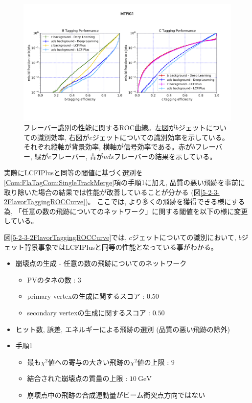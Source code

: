 \begin{figure}[htbp]
 \centering
 \includegraphics[trim = 0 150 0 200, width=1.0\textwidth, clip]{Figure/5Comparison/5-2-3-1FlavorTaggingROCCurve.png}
 \caption[フレーバータギングの性能に関するROC曲線]{フレーバー識別の性能に関するROC曲線。左図が$b$ジェットについての識別効率, 右図が$c$ジェットについての識別効率を示している。それぞれ縦軸が背景効率, 横軸が信号効率である。赤が$b$フレーバー, 緑が$c$フレーバー, 青が$uds$フレーバーの結果を示している。}
 \label{5-2-3-1FlavorTaggingROCCurve}
\end{figure}

実際にLCFIPlusと同等の閾値に基づく選別を\ref{Com:FlaTagCom:SingleTrackMerge}項の手順1に加え, 品質の悪い飛跡を事前に取り除いた場合の結果では性能が改善していることが分かる (図\ref{5-2-3-2FlavorTaggingROCCurve})。
ここでは, より多くの飛跡を獲得できる様にする為, 「任意の数の飛跡についてのネットワーク」に関する閾値を以下の様に変更している。

図\ref{5-2-3-2FlavorTaggingROCCurve}では, $c$ジェットについての識別において, $b$ジェット背景事象ではLCFIPlusと同等の性能となっている事がわかる。

\newpage
\begin{itemize}
 \item 崩壊点の生成 - 任意の数の飛跡についてのネットワーク
 \begin{itemize}
   \item PVのタネの数 : $3$
   \item primary vertexの生成に関するスコア : $0.50$
   \item secondary vertexの生成に関するスコア : $0.50$
 \end{itemize}
 \item ヒット数, 誤差, エネルギーによる飛跡の選別 (品質の悪い飛跡の除外)
 \item 手順1
 \begin{itemize}
  \item 最も$\chi^2$値への寄与の大きい飛跡の$\chi^2$値の上限 : $9$
  \item 結合された崩壊点の質量の上限 : $10\ \mathrm{GeV}$
  \item 崩壊点中の飛跡の合成運動量がビーム衝突点方向ではない
 \end{itemize}
\end{itemize}


